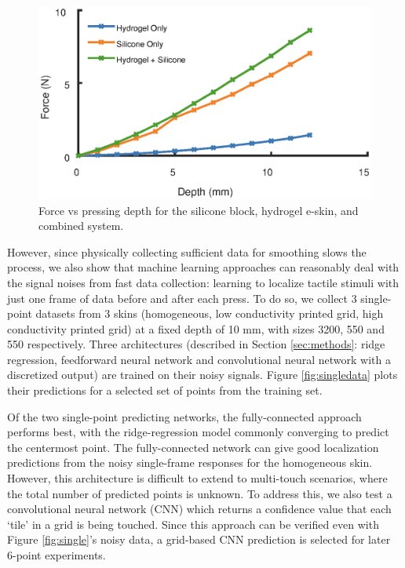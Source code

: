 \begin{figure}[htbp]
  \centering
  \includegraphics[width=\linewidth]{Images/ForceFig.eps}
  \caption{Force vs pressing depth for the silicone block, hydrogel e-skin, and combined system.}
  \label{fig:forces}
\end{figure}

However, since physically collecting sufficient data for smoothing slows the process, we also show that machine learning approaches can reasonably deal with the signal noises from fast data collection: learning to localize tactile stimuli with just one frame of data before and after each press. To do so, we collect 3 single-point datasets from 3 skins (homogeneous, low conductivity printed grid, high conductivity printed grid) at a fixed depth of 10 mm, with sizes 3200, 550 and 550 respectively. Three architectures (described in Section \ref{sec:methods}: ridge regression, feedforward neural network and convolutional neural network with a discretized output) are trained on their noisy signals. Figure \ref{fig:singledata} plots their predictions for a selected set of points from the training set.

Of the two single-point predicting networks, the fully-connected approach performs best, with the ridge-regression model commonly converging to predict the centermost point. The fully-connected network can give good localization predictions from the noisy single-frame responses for the homogeneous skin. However, this architecture is difficult to extend to multi-touch scenarios, where the total number of predicted points is unknown. To address this, we also test a convolutional neural network (CNN) which returns a confidence value that each `tile' in a grid is being touched. Since this approach can be verified even with Figure \ref{fig:single}'s noisy data, a grid-based CNN prediction is selected for later 6-point experiments.  

